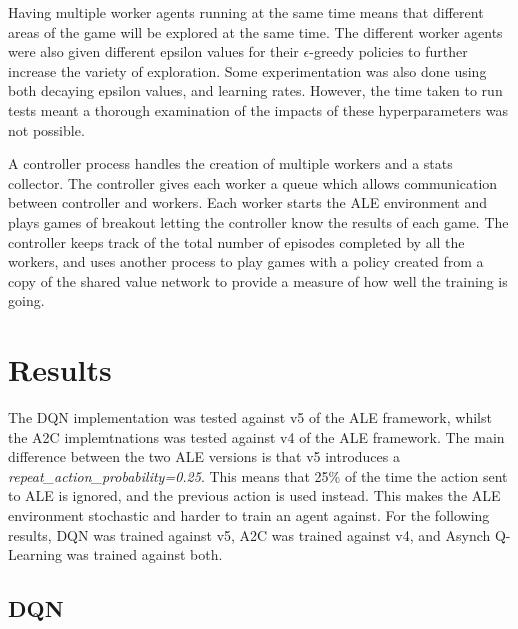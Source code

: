 \documentclass{article}
\begin{document}
Having multiple worker agents running at the same time means that different areas of the game will be explored at the same time.
The different worker agents were also given different epsilon values for their $\epsilon$-greedy policies to further increase the variety of exploration.
Some experimentation was also done using both decaying epsilon values, and learning rates. However, the time taken to run tests meant a thorough examination of the impacts of these hyperparameters was not possible.

A controller process handles the creation of multiple workers and a stats collector.
The controller gives each worker a queue which allows communication between controller and workers.
Each worker starts the ALE environment and plays games of breakout letting the controller know the results of each game.
The controller keeps track of the total number of episodes completed by all the workers, and uses another process to play games with a policy created from a copy of the shared value network to provide a measure of how well the training is going.

\section{Results}

The DQN implementation was tested against v5 of the ALE framework, whilst the A2C implemtnations was tested against v4 of the ALE framework. The main difference between the two ALE versions is that v5 introduces a \emph{repeat\_action\_probability=0.25}. This  means that 25\% of the time the action sent to ALE is ignored, and the previous action is used instead. This makes the ALE environment stochastic and harder to train an agent against. For the following results, DQN was trained against v5, A2C was trained against v4, and Asynch Q-Learning was trained against both.


\subsection{DQN}
\end{document}
